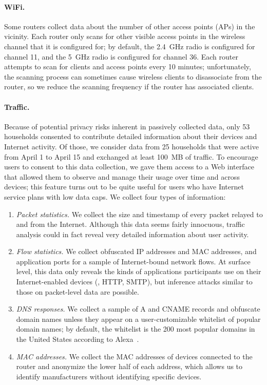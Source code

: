\paragraph{WiFi.} Some routers collect data about the number of other access
points (APs) in the vicinity.  Each router only scans for other visible access
points in the wireless channel that it is configured for; by default, the
2.4~GHz radio is configured for channel 11, and the 5~GHz radio is configured
for channel 36. Each router attempts to scan for clients and access points every
10 minutes; unfortunately, the scanning process can sometimes cause wireless
clients to disassociate from the router,  so we reduce the scanning frequency if
the router has associated clients.

\paragraph{Traffic.} Because of potential privacy risks inherent in passively
collected data, only 53 households consented to contribute detailed information
about their devices and Internet activity. Of those, we consider data from
25 households that were active from April 1 to April 15 and exchanged at least
100~MB of traffic. To encourage 
users to consent to this data collection, we gave them access to a Web
interface that allowed them to observe and manage their usage over time and
across devices; this feature turns out to be quite useful for users who have
Internet service plans with low data caps. We collect four types of information:

\begin{enumerate}
\itemsep=-1pt
\item {\em Packet statistics.} We collect the size and timestamp of every packet
    relayed to and from the Internet. Although this data seems fairly innocuous,
    traffic analysis could in fact reveal very detailed information about user
    activity.
\item {\em Flow statistics.} We collect obfuscated IP addresses and MAC
  addresses, and application ports for a sample of Internet-bound
  network flows. At surface level, this data only reveals the kinds of
  applications participants use on their Internet-enabled devices (\eg,
  HTTP, SMTP), but inference attacks similar to those on packet-level
  data are possible.
\item {\em DNS responses.} We collect a sample of A and CNAME records and
    obfuscate domain names unless they appear on a user-customizable whitelist
    of popular domain names; by default, the whitelist is the 200 most popular
    domains in the United States according to Alexa~\cite{www-alexa-us}.
\item {\em MAC addresses.} We collect the MAC addresses of devices connected to
    the router and anonymize the lower half of each address, which allows us to
    identify manufacturers without identifying specific devices.
\end{enumerate}

